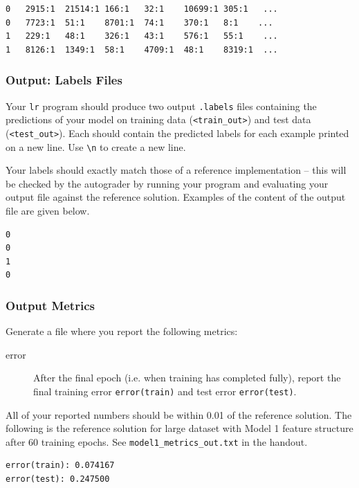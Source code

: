 \documentclass[11pt]{article}
\numberwithin{equation}{section} %
\numberwithin{figure}{section} %
\numberwithin{table}{section} %
\begin{document}
\begin{lstlisting}
0	2915:1	21514:1	166:1	32:1	10699:1	305:1	...
0	7723:1	51:1	8701:1	74:1	370:1	8:1    ...
1	229:1	48:1	326:1	43:1	576:1	55:1	...
1	8126:1	1349:1	58:1	4709:1	48:1	8319:1	...
\end{lstlisting}


\subsubsection{Output: Labels Files} \label{output}
Your \lstinline{lr} program should produce two output \texttt{.labels} files containing the predictions of your model on training data (\texttt{<train\_out>}) and test data (\texttt{<test\_out>}). Each should contain the predicted labels for each example printed on a new line. Use \lstinline{\n} to create a new line. 

Your labels should exactly match those of a reference implementation -- this will be checked by the autograder by running your program and evaluating your output file against the reference solution. Examples of the content of the output file are given below.

\begin{lstlisting}
0
0
1
0
\end{lstlisting}

\subsubsection{Output Metrics} \label{metrics}
Generate a file where you report the following metrics: 

\begin{description}

\item[error] After the final epoch (i.e. when training has completed fully), report the final training error \newline \lstinline{error(train)} and test error \lstinline{error(test)}. 
\end{description}

All of your reported numbers should be within 0.01 of the reference solution. The following is the reference solution for large dataset with Model 1 feature structure after 60 training epochs. See \newline \lstinline{model1_metrics_out.txt} in the handout.

\begin{lstlisting}
error(train): 0.074167
error(test): 0.247500
\end{lstlisting}
\end{document}
